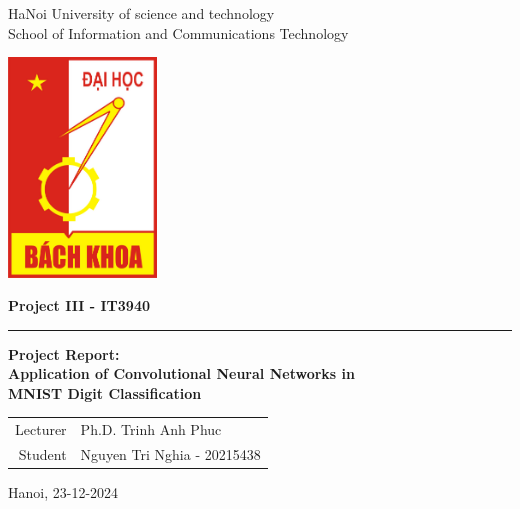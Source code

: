 \documentclass[a4paper, 30pt]{article}
\begin{document}
  \begin{titlepage}
    
    \begin{center}
            \large{HaNoi University of science and technology} \\
            \large{School of Information and Communications Technology} 
    \end{center}

    \vspace{64pt}

    \begin{center}
      \includegraphics[width=112pt]{img/logo.jpg}
    \end{center}

    \vspace{28pt}

    \begin{center}
        \large\textbf{Project III - IT3940} \\
        
        \par\rule{0.9\textwidth}{0.4pt}

        \Large\textbf{
          Project Report: \\[8pt]
          Application of Convolutional Neural Networks in \\
          MNIST Digit Classification
        }
        \vspace{14pt}
    \end{center}

    \vspace{16pt}
    
    \begin{center}
      \hspace{48pt}
      \begin{tabularx}{0.5\textwidth}{r@{: }l}
        Lecturer & Ph.D. Trinh Anh Phuc \\[6pt]
        Student  & Nguyen Tri Nghia - 20215438
      \end{tabularx}
    \end{center}

    \vfill

    \begin{center}
        {Hanoi, 23-12-2024}
    \end{center}

  \end{titlepage}
\end{document}
